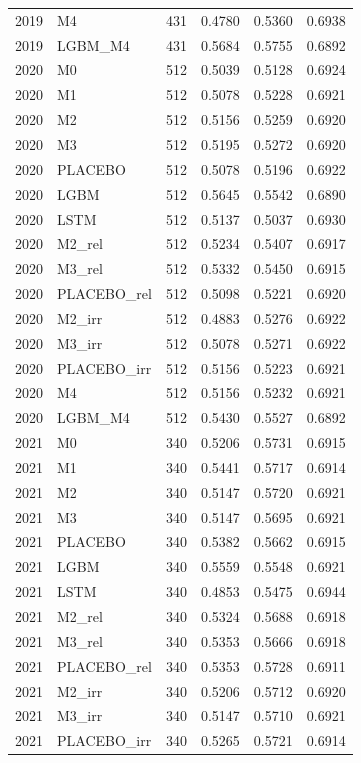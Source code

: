 \begin{tabular}{llrrrr}
2019 & M4 & 431 & 0.4780 & 0.5360 & 0.6938 \\
2019 & LGBM\_M4 & 431 & 0.5684 & 0.5755 & 0.6892 \\
2020 & M0 & 512 & 0.5039 & 0.5128 & 0.6924 \\
2020 & M1 & 512 & 0.5078 & 0.5228 & 0.6921 \\
2020 & M2 & 512 & 0.5156 & 0.5259 & 0.6920 \\
2020 & M3 & 512 & 0.5195 & 0.5272 & 0.6920 \\
2020 & PLACEBO & 512 & 0.5078 & 0.5196 & 0.6922 \\
2020 & LGBM & 512 & 0.5645 & 0.5542 & 0.6890 \\
2020 & LSTM & 512 & 0.5137 & 0.5037 & 0.6930 \\
2020 & M2\_rel & 512 & 0.5234 & 0.5407 & 0.6917 \\
2020 & M3\_rel & 512 & 0.5332 & 0.5450 & 0.6915 \\
2020 & PLACEBO\_rel & 512 & 0.5098 & 0.5221 & 0.6920 \\
2020 & M2\_irr & 512 & 0.4883 & 0.5276 & 0.6922 \\
2020 & M3\_irr & 512 & 0.5078 & 0.5271 & 0.6922 \\
2020 & PLACEBO\_irr & 512 & 0.5156 & 0.5223 & 0.6921 \\
2020 & M4 & 512 & 0.5156 & 0.5232 & 0.6921 \\
2020 & LGBM\_M4 & 512 & 0.5430 & 0.5527 & 0.6892 \\
2021 & M0 & 340 & 0.5206 & 0.5731 & 0.6915 \\
2021 & M1 & 340 & 0.5441 & 0.5717 & 0.6914 \\
2021 & M2 & 340 & 0.5147 & 0.5720 & 0.6921 \\
2021 & M3 & 340 & 0.5147 & 0.5695 & 0.6921 \\
2021 & PLACEBO & 340 & 0.5382 & 0.5662 & 0.6915 \\
2021 & LGBM & 340 & 0.5559 & 0.5548 & 0.6921 \\
2021 & LSTM & 340 & 0.4853 & 0.5475 & 0.6944 \\
2021 & M2\_rel & 340 & 0.5324 & 0.5688 & 0.6918 \\
2021 & M3\_rel & 340 & 0.5353 & 0.5666 & 0.6918 \\
2021 & PLACEBO\_rel & 340 & 0.5353 & 0.5728 & 0.6911 \\
2021 & M2\_irr & 340 & 0.5206 & 0.5712 & 0.6920 \\
2021 & M3\_irr & 340 & 0.5147 & 0.5710 & 0.6921 \\
2021 & PLACEBO\_irr & 340 & 0.5265 & 0.5721 & 0.6914 \\

\end{tabular}
